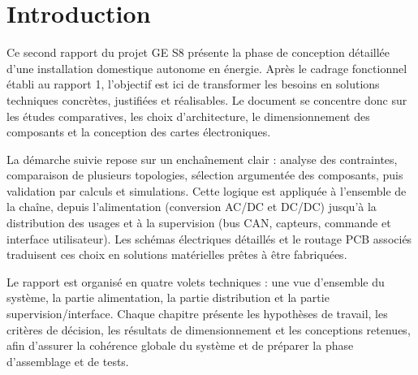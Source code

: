 \chapter*{Introduction}

\hspace{1cm} Ce second rapport du projet GE S8 présente la phase de conception détaillée d'une installation domestique autonome en énergie. Après le cadrage fonctionnel établi au rapport 1, l'objectif est ici de transformer les besoins en solutions techniques concrètes, justifiées et réalisables. Le document se concentre donc sur les études comparatives, les choix d'architecture, le dimensionnement des composants et la conception des cartes électroniques.

La démarche suivie repose sur un enchaînement clair : analyse des contraintes, comparaison de plusieurs topologies, sélection argumentée des composants, puis validation par calculs et simulations. Cette logique est appliquée à l'ensemble de la chaîne, depuis l'alimentation (conversion AC/DC et DC/DC) jusqu'à la distribution des usages et à la supervision (bus CAN, capteurs, commande et interface utilisateur). Les schémas électriques détaillés et le routage PCB associés traduisent ces choix en solutions matérielles prêtes à être fabriquées.

Le rapport est organisé en quatre volets techniques : une vue d'ensemble du système, la partie alimentation, la partie distribution et la partie supervision/interface. Chaque chapitre présente les hypothèses de travail, les critères de décision, les résultats de dimensionnement et les conceptions retenues, afin d'assurer la cohérence globale du système et de préparer la phase d'assemblage et de tests.